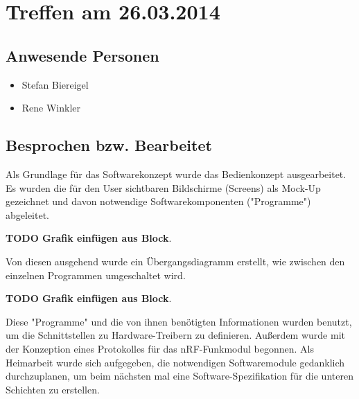\chapter{Treffen am 26.03.2014}
\section{Anwesende Personen}
\begin{itemize}
	\item Stefan Biereigel
	\item Rene Winkler
\end{itemize}

\section{Besprochen bzw. Bearbeitet}
Als Grundlage für das Softwarekonzept wurde das Bedienkonzept ausgearbeitet. Es wurden die für den User sichtbaren Bildschirme (Screens) als Mock-Up gezeichnet und davon notwendige Softwarekomponenten ("Programme") abgeleitet. 

\textbf{TODO Grafik einfügen aus Block}.

Von diesen ausgehend wurde ein Übergangsdiagramm erstellt, wie zwischen den einzelnen Programmen umgeschaltet wird. 

\textbf{TODO Grafik einfügen aus Block}.

Diese "Programme" und die von ihnen benötigten Informationen wurden benutzt, um die Schnittstellen zu Hardware-Treibern zu definieren. 
Außerdem wurde mit der Konzeption eines Protokolles für das nRF-Funkmodul begonnen. Als Heimarbeit wurde sich aufgegeben, die notwendigen Softwaremodule gedanklich durchzuplanen, um beim nächsten mal eine Software-Spezifikation für die unteren Schichten zu erstellen.